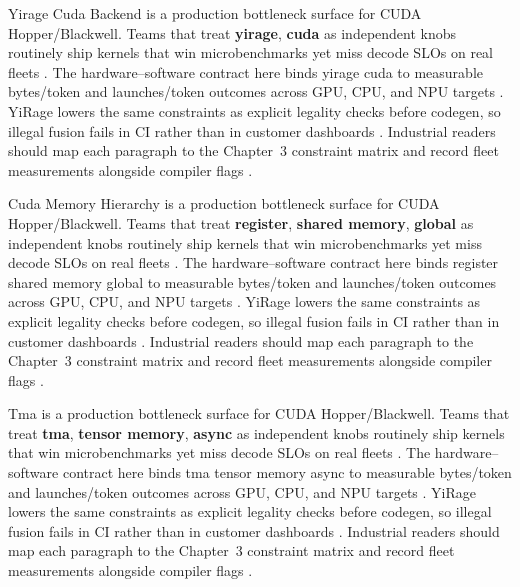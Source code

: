 Yirage Cuda Backend is a production bottleneck surface for CUDA Hopper/Blackwell. Teams that treat \textbf{yirage}, \textbf{cuda} as independent knobs routinely ship kernels that win microbenchmarks yet miss decode SLOs on real fleets \citep{patel2025llminference,nvidia2022hopper}. The hardware--software contract here binds yirage cuda to measurable bytes/token and launches/token outcomes across GPU, CPU, and NPU targets \citep{taxbreak2026,semianalysis2024tma}. YiRage lowers the same constraints as explicit legality checks before codegen, so illegal fusion fails in CI rather than in customer dashboards \citep{memoryfloor2026,amd2024xdna}. Industrial readers should map each paragraph to the Chapter~3 constraint matrix and record fleet measurements alongside compiler flags \citep{nvidia2022hopper,amd2024aie}.

Cuda Memory Hierarchy is a production bottleneck surface for CUDA Hopper/Blackwell. Teams that treat \textbf{register}, \textbf{shared memory}, \textbf{global} as independent knobs routinely ship kernels that win microbenchmarks yet miss decode SLOs on real fleets \citep{taxbreak2026,semianalysis2024tma}. The hardware--software contract here binds register shared memory global to measurable bytes/token and launches/token outcomes across GPU, CPU, and NPU targets \citep{memoryfloor2026,amd2024xdna}. YiRage lowers the same constraints as explicit legality checks before codegen, so illegal fusion fails in CI rather than in customer dashboards \citep{nvidia2022hopper,amd2024aie}. Industrial readers should map each paragraph to the Chapter~3 constraint matrix and record fleet measurements alongside compiler flags \citep{semianalysis2024tma,dlbook}.

Tma is a production bottleneck surface for CUDA Hopper/Blackwell. Teams that treat \textbf{tma}, \textbf{tensor memory}, \textbf{async} as independent knobs routinely ship kernels that win microbenchmarks yet miss decode SLOs on real fleets \citep{memoryfloor2026,amd2024xdna}. The hardware--software contract here binds tma tensor memory async to measurable bytes/token and launches/token outcomes across GPU, CPU, and NPU targets \citep{nvidia2022hopper,amd2024aie}. YiRage lowers the same constraints as explicit legality checks before codegen, so illegal fusion fails in CI rather than in customer dashboards \citep{semianalysis2024tma,dlbook}. Industrial readers should map each paragraph to the Chapter~3 constraint matrix and record fleet measurements alongside compiler flags \citep{amd2024xdna,dao2022flashattention}.

